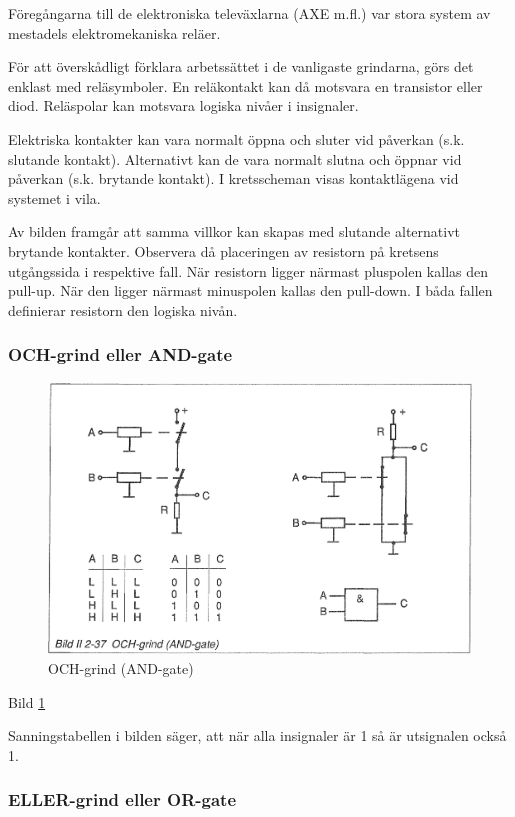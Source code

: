 Föregångarna till de elektroniska televäxlarna (AXE m.fl.) var stora system av
mestadels elektromekaniska reläer.

För att överskådligt förklara arbetssättet i de vanligaste grindarna, görs det
enklast med reläsymboler. En reläkontakt kan då motsvara en transistor eller
diod. Reläspolar kan motsvara logiska nivåer i insignaler.

Elektriska kontakter kan vara normalt öppna och sluter vid påverkan (s.k.
slutande kontakt). Alternativt kan de vara normalt slutna och öppnar vid
påverkan (s.k. brytande kontakt). I kretsscheman visas kontaktlägena vid
systemet i vila.

Av bilden framgår att samma villkor kan skapas med slutande alternativt brytande
kontakter. Observera då placeringen av resistorn på kretsens utgångssida i
respektive fall. När resistorn ligger närmast pluspolen kallas den pull-up. När
den ligger närmast minuspolen kallas den pull-down. I båda fallen definierar
resistorn den logiska nivån.

\subsubsection{OCH-grind eller AND-gate}

\begin{figure}
\includegraphics[width=\textwidth]{images/bild_2_2-37}
\caption{OCH-grind (AND-gate)}
\label{fig:BildII2-37}
\end{figure}

Bild \ref{fig:BildII2-37}

Sanningstabellen i bilden säger, att när alla insignaler är 1 så är utsignalen
också 1.

\subsubsection{ELLER-grind eller OR-gate}

